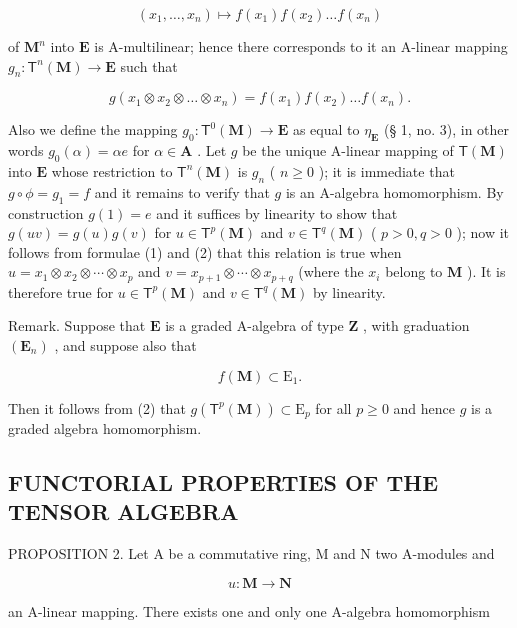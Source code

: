 \[
(x _ {1}, \dots , x _ {n}) \mapsto f (x _ {1}) f (x _ {2}) \dots f (x _ {n})
\]

of \(\mathbf{M}^n\) into \(\mathbf{E}\) is A-multilinear; hence there corresponds to it an A-linear mapping \(g_n: \mathsf{T}^n(\mathbf{M}) \to \mathbf{E}\) such that

\[
g \left(x _ {1} \otimes x _ {2} \otimes \dots \otimes x _ {n}\right) = f \left(x _ {1}\right) f \left(x _ {2}\right) \dots f \left(x _ {n}\right).\tag{2}
\]

Also we define the mapping \(g_0 \colon \mathsf{T}^0(\mathbf{M}) \to \mathbf{E}\) as equal to \(\eta_{\mathbf{E}}\) (§ 1, no. 3), in other words \(g_0(\alpha) = \alpha e\) for \(\alpha \in \mathbf{A}\) . Let \(g\) be the unique A-linear mapping of \(\mathsf{T}(\mathbf{M})\) into \(\mathbf{E}\) whose restriction to \(\mathsf{T}^n(\mathbf{M})\) is \(g_n\) ( \(n \geqslant 0\) ); it is immediate that \(g \circ \phi = g_1 = f\) and it remains to verify that \(g\) is an A-algebra homomorphism. By construction \(g(1) = e\) and it suffices by linearity to show that \(g(uv) = g(u)g(v)\) for \(u \in \mathsf{T}^p(\mathbf{M})\) and \(v \in \mathsf{T}^q(\mathbf{M})\) ( \(p > 0, q > 0\) ); now it follows from formulae (1) and (2) that this relation is true when \(u = x_1 \otimes x_2 \otimes \cdots \otimes x_p\) and \(v = x_{p+1} \otimes \cdots \otimes x_{p+q}\) (where the \(x_i\) belong to \(\mathbf{M}\) ). It is therefore true for \(u \in \mathsf{T}^p(\mathbf{M})\) and \(v \in \mathsf{T}^q(\mathbf{M})\) by linearity.

Remark. Suppose that \(\mathbf{E}\) is a graded A-algebra of type \(\mathbf{Z}\) , with graduation \((\mathbf{E}_n)\) , and suppose also that

\[
f (\mathbf {M}) \subset \mathrm{E} _ {1}.\tag{3}
\]

Then it follows from (2) that \(g(\mathsf{T}^p (\mathbf{M})) \subset \mathrm{E}_p\) for all \(p \geqslant 0\) and hence \(g\) is a graded algebra homomorphism.

\subsection{FUNCTORIAL PROPERTIES OF THE TENSOR ALGEBRA}

PROPOSITION 2. Let A be a commutative ring, M and N two A-modules and

\[
u: \mathbf {M} \rightarrow \mathbf {N}
\]

an A-linear mapping. There exists one and only one A-algebra homomorphism

